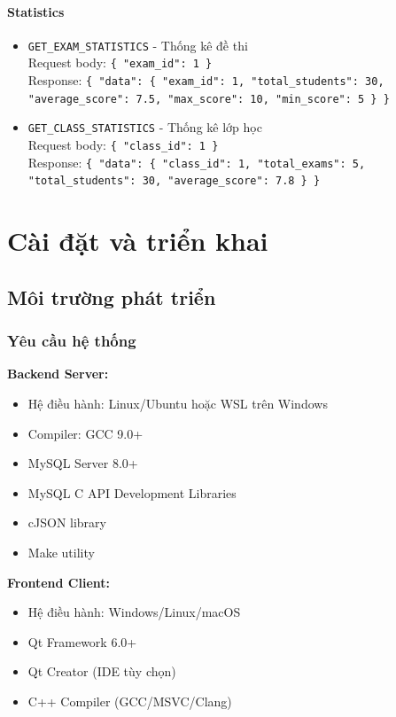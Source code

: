 \documentclass[12pt,a4paper]{report}
\newcommand{\json}[1]{\texttt{\allowbreak#1\allowbreak}}
\begin{document}
\subsubsection{Statistics}
\begin{itemize}
    \item \texttt{GET\_EXAM\_STATISTICS} - Thống kê đề thi \\
    Request body: \json{\{ "exam\_id": 1 \}} \\
    Response: \json{\{ "data": \{ "exam\_id": 1, "total\_students": 30, "average\_score": 7.5, "max\_score": 10, "min\_score": 5 \} \}}
    \item \texttt{GET\_CLASS\_STATISTICS} - Thống kê lớp học \\
    Request body: \json{\{ "class\_id": 1 \}} \\
    Response: \json{\{ "data": \{ "class\_id": 1, "total\_exams": 5, "total\_students": 30, "average\_score": 7.8 \} \}}
\end{itemize}
\fussy

\chapter{Cài đặt và triển khai}

\section{Môi trường phát triển}

\subsection{Yêu cầu hệ thống}

\textbf{Backend Server:}
\begin{itemize}
    \item Hệ điều hành: Linux/Ubuntu hoặc WSL trên Windows
    \item Compiler: GCC 9.0+
    \item MySQL Server 8.0+
    \item MySQL C API Development Libraries
    \item cJSON library
    \item Make utility
\end{itemize}

\textbf{Frontend Client:}
\begin{itemize}
    \item Hệ điều hành: Windows/Linux/macOS
    \item Qt Framework 6.0+
    \item Qt Creator (IDE tùy chọn)
    \item C++ Compiler (GCC/MSVC/Clang)
\end{itemize}
\end{document}
